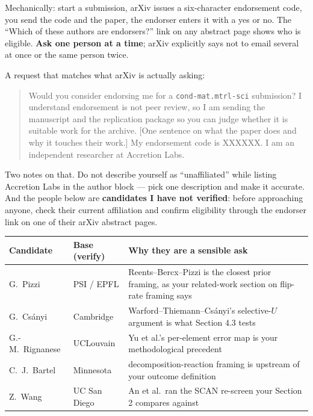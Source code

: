 \documentclass[11pt]{article}
\begin{document}
Mechanically: start a submission, arXiv issues a six-character endorsement code, you send
the code and the paper, the endorser enters it with a yes or no. The ``Which of these authors
are endorsers?'' link on any abstract page shows who is eligible. \textbf{Ask one person at a
time}; arXiv explicitly says not to email several at once or the same person twice.

A request that matches what arXiv is actually asking:

\begin{quote}
Would you consider endorsing me for a \texttt{cond-mat.mtrl-sci} submission? I understand
endorsement is not peer review, so I am sending the manuscript and the replication package
so you can judge whether it is suitable work for the archive. [One sentence on what the
paper does and why it touches their work.] My endorsement code is XXXXXX. I am an
independent researcher at Accretion Labs.
\end{quote}

Two notes on that. Do not describe yourself as ``unaffiliated'' while listing Accretion Labs
in the author block --- pick one description and make it accurate. And the people below are
\textbf{candidates I have not verified}: before approaching anyone, check their current
affiliation and confirm eligibility through the endorser link on one of their arXiv abstract
pages.

\begin{center}
\begin{tabular}{llp{}}
\toprule
Candidate & Base (verify) & Why they are a sensible ask \\
\midrule
G.\ Pizzi & PSI / EPFL & Reents--Bercx--Pizzi is the closest prior framing, as your related-work section on flip-rate framing says \\
G.\ Cs\'anyi & Cambridge & Warford--Thiemann--Cs\'anyi's selective-$U$ argument is what Section 4.3 tests \\
G.-M.\ Rignanese & UCLouvain & Yu et al.'s per-element error map is your methodological precedent \\
C.\ J.\ Bartel & Minnesota & decomposition-reaction framing is upstream of your outcome definition \\
Z.\ Wang & UC San Diego & An et al.\ ran the SCAN re-screen your Section 2 compares against \\
\bottomrule
\end{tabular}
\end{center}
\end{document}
